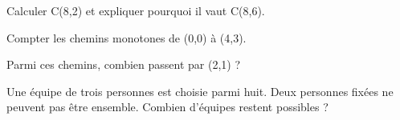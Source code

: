 \documentclass[11pt]{article}
\begin{document}
Calculer C(8,2) et expliquer pourquoi il vaut C(8,6).\par
\vspace{5pt}
Compter les chemins monotones de (0,0) à (4,3).\par
\vspace{5pt}
Parmi ces chemins, combien passent par (2,1) ?\par
\vspace{5pt}
Une équipe de trois personnes est choisie parmi huit. Deux personnes fixées ne peuvent pas être ensemble. Combien d’équipes restent possibles ?\par
\vspace{5pt}
\end{document}
